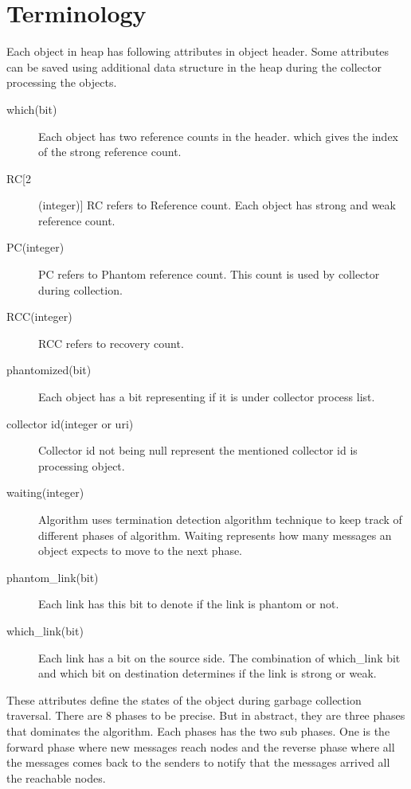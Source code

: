 \documentclass{article}
\begin{document}
\section{Terminology}
Each object in heap has following attributes in object header. Some attributes can be saved using additional data structure in the heap during the collector processing the objects. 
\begin{description}
  \item[which(bit)] Each object has two reference counts in the header. which gives the index of the strong reference count.
  \item[RC[2](integer)] RC refers to Reference count. Each object has strong and weak reference count.
  \item[PC(integer)] PC refers to Phantom reference count. This count is used by collector during collection.
  \item[RCC(integer)] RCC refers to recovery count.
  \item[phantomized(bit)] Each object has a bit representing if it is under collector process list.
  \item[collector id(integer or uri)] Collector id not being null represent the mentioned collector id is processing object.
  \item[waiting(integer)] Algorithm uses termination detection algorithm technique to keep track of different phases of algorithm. Waiting represents how many messages an object expects to move to the next phase.
  \item[phantom\_link(bit)] Each link has this bit to denote if the link is phantom or not.
  \item[which\_link(bit)] Each link has a bit on the source side. The combination of which\_link bit and which bit on destination determines if the link is strong or weak.
\end{description}
These attributes define the states of the object during garbage collection traversal. There are 8 phases to be precise. But in abstract, they are three phases that dominates the algorithm. Each phases has the two sub phases. One is the forward phase where new messages reach nodes and the reverse phase where all the messages comes back to the senders to notify that the messages arrived all the reachable nodes. 
\end{document}
